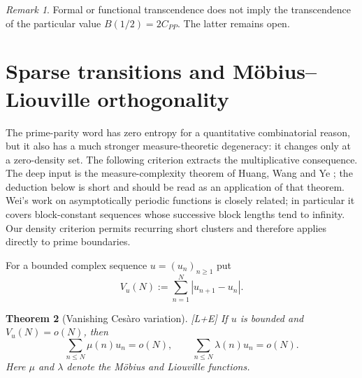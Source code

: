 \documentclass[11pt]{article}
\newtheorem{theorem}{Theorem}[section]
\theoremstyle{definition}
\theoremstyle{remark}
\newtheorem{remark}[theorem]{Remark}
\newcommand{\status}[1]{\textnormal{\textcolor{accent}{\footnotesize[#1]}}}
\begin{document}
\begin{remark}
Formal or functional transcendence does not imply the transcendence of the particular
value $B(1/2)=2C_{PP}$.  The latter remains open.
\end{remark}

\section{Sparse transitions and M\"obius--Liouville orthogonality}

The prime-parity word has zero entropy for a quantitative combinatorial reason, but it
also has a much stronger measure-theoretic degeneracy: it changes only at a zero-density
set.  The following criterion extracts the multiplicative consequence.  The deep input is
the measure-complexity theorem of Huang, Wang and Ye \cite{HWY}; the deduction below is
short and should be read as an application of that theorem.  Wei's work on asymptotically
periodic functions \cite{Wei} is closely related; in particular it covers block-constant
sequences whose successive block lengths tend to infinity.  Our density criterion permits
recurring short clusters and therefore applies directly to prime boundaries.

For a bounded complex sequence $u=(u_n)_{n\ge1}$ put
\[
 V_u(N):=\sum_{n=1}^{N}|u_{n+1}-u_n|.
\]

\begin{theorem}[Vanishing Ces\`aro variation]\label{thm:variation-orthogonality}
\status{L+E}
If $u$ is bounded and $V_u(N)=o(N)$, then
\begin{equation}\label{eq:mu-lambda-orthogonality}
 \sum_{n\le N}\mu(n)u_n=o(N),
 \qquad
 \sum_{n\le N}\lambda(n)u_n=o(N).
\end{equation}
Here $\mu$ and $\lambda$ denote the M\"obius and Liouville functions.
\end{theorem}
\end{document}
